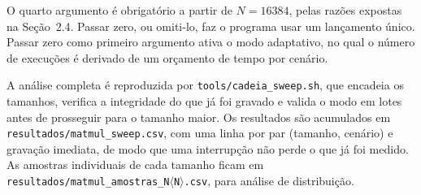 \documentclass[12pt]{article}
\begin{document}
O quarto argumento é obrigatório a partir de $N=16384$, pelas razões expostas na
Seção~2.4. Passar zero, ou omiti-lo, faz o programa usar um lançamento único.
Passar zero como primeiro argumento ativa o modo adaptativo, no qual o número de
execuções é derivado de um orçamento de tempo por cenário.

A análise completa é reproduzida por \texttt{tools/cadeia\_sweep.sh}, que
encadeia os tamanhos, verifica a integridade do que já foi gravado e valida o
modo em lotes antes de prosseguir para o tamanho maior. Os resultados são
acumulados em \texttt{resultados/matmul\_sweep.csv}, com uma linha por par
(tamanho, cenário) e gravação imediata, de modo que uma interrupção não perde o
que já foi medido. As amostras individuais de cada tamanho ficam em
\texttt{resultados/matmul\_amostras\_N$\langle$N$\rangle$.csv}, para análise de
distribuição.
\end{document}
